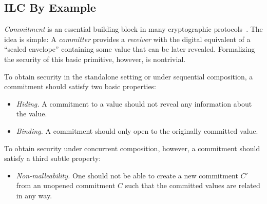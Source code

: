 \subsection{ILC By Example}
\label{subsec:ilc-flavored}

\emph{Commitment} is an essential building block in many cryptographic
protocols~\cite{brassard1988minimum}. The idea is simple: A \emph{committer}
provides a \emph{receiver} with the digital equivalent of a ``sealed envelope''
containing some value that can be later revealed. Formalizing the security
of this basic primitive, however, is nontrivial.

To obtain security in the standalone setting or under sequential composition, a
commitment should satisfy two basic properties:
\begin{itemize}[leftmargin=*]
\item \emph{Hiding.} A commitment to a value should not reveal any information
  about the value.
\item \emph{Binding.} A commitment should only open to the originally committed value.
\end{itemize}

\noindent To obtain security under concurrent composition, however, a commitment
should satisfy a third subtle property:
\begin{itemize}[leftmargin=*]
\item \emph{Non-malleability.} One should not be able to create a new commitment
  $C'$ from an unopened commitment $C$ such that the committed values are
  related in any way.
\end{itemize}

